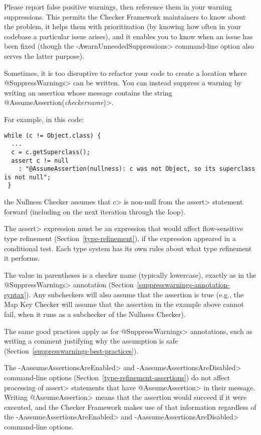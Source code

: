 \noindent
Please report false positive warnings, then reference them in your warning suppressions.
This permits the Checker Framework maintainers to know about the
problem, it helps them with prioritization (by knowing how often in your
codebase a particular issue arises), and it enables you to know when an
issue has been fixed (though the \<-AwarnUnneededSuppressions> command-line
option also serves the latter purpose).



\begin{sloppypar}
Sometimes, it is too disruptive to refactor your code to create a location
where \<@SuppressWarnings> can be written.  You can instead suppress a
warning by writing an assertion whose message contains the string
\<@AssumeAssertion(\emph{checkername})>.
\end{sloppypar}

For example, in this code:

\begin{Verbatim}
while (c != Object.class) {
  ...
  c = c.getSuperclass();
  assert c != null
    : "@AssumeAssertion(nullness): c was not Object, so its superclass is not null";
 }
\end{Verbatim}

\noindent
the Nullness Checker assumes that \<c> is non-null from the \<assert>
statement forward (including on the next iteration through the loop).

The \<assert> expression must be an expression that would affect flow-sensitive
type refinement (Section~\ref{type-refinement}), if the
expression appeared in a conditional test.  Each type system has its own
rules about what type refinement it performs.

The value in parentheses is a checker name (typically lowercase),
exactly as in the \<@SuppressWarnings> annotation
(Section~\ref{suppresswarnings-annotation-syntax}).
Any subcheckers will also assume that the
assertion is true (e.g., the Map Key Checker will assume that
the assertion in the example above cannot fail, when it runs
as a subchecker of the Nullness Checker).

The same good practices apply
as for \<@SuppressWarnings> annotations, such as writing a comment
justifying why the assumption is safe
(Section~\ref{suppresswarnings-best-practices}).

The \<-AassumeAssertionsAreEnabled> and \<-AassumeAssertionsAreDisabled>
command-line options (Section~\ref{type-refinement-assertions}) do not
affect processing of \<assert> statements that have \<@AssumeAssertion> in
their message.  Writing \<@AssumeAssertion> means that the assertion would
succeed if it were executed, and the Checker Framework makes use of that
information regardless of the \<-AassumeAssertionsAreEnabled> and
\<-AassumeAssertionsAreDisabled> command-line options.


